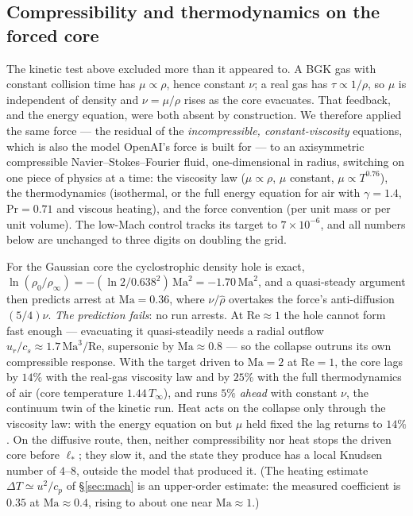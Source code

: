 \documentclass[11pt,a4paper]{article}
\begin{document}
\subsection{Compressibility and thermodynamics on the forced core}
\label{sec:compressible}

The kinetic test above excluded more than it appeared to. A BGK gas with constant collision time has
$\mu\propto\rho$, hence constant $\nu$; a real gas has $\tau\propto1/\rho$, so $\mu$ is independent of
density and $\nu=\mu/\rho$ rises as the core evacuates. That feedback, and the energy equation, were
both absent by construction. We therefore applied the same force --- the residual of the
\emph{incompressible, constant-viscosity} equations, which is also the model OpenAI's force is built
for --- to an axisymmetric compressible Navier--Stokes--Fourier fluid, one-dimensional in radius,
switching on one piece of physics at a time: the viscosity law ($\mu\propto\rho$, $\mu$ constant,
$\mu\propto T^{0.76}$), the thermodynamics (isothermal, or the full energy equation for air with
$\gamma=1.4$, $\mathrm{Pr}=0.71$ and viscous heating), and the force convention (per unit mass or per
unit volume). The low-Mach control tracks its target to $7\times10^{-6}$, and all numbers below are
unchanged to three digits on doubling the grid.

For the Gaussian core the cyclostrophic density hole is exact,
$\ln(\rho_0/\rho_\infty)=-(\ln2/0.638^2)\,\mathrm{Ma}^2=-1.70\,\mathrm{Ma}^2$, and a quasi-steady
argument then predicts arrest at $\mathrm{Ma}=0.36$, where $\nu/\hat\rho$ overtakes the force's
anti-diffusion $(5/4)\nu$. \emph{The prediction fails}: no run arrests. At $\mathrm{Re}\approx1$ the
hole cannot form fast enough --- evacuating it quasi-steadily needs a radial outflow
$u_r/c_s\approx1.7\,\mathrm{Ma}^3/\mathrm{Re}$, supersonic by $\mathrm{Ma}\approx0.8$ --- so the
collapse outruns its own compressible response. With the target driven to $\mathrm{Ma}=2$ at
$\mathrm{Re}=1$, the core lags by $14\%$ with the real-gas viscosity law and by $25\%$ with the full
thermodynamics of air (core temperature $1.44\,T_\infty$), and runs $5\%$ \emph{ahead} with constant
$\nu$, the continuum twin of the kinetic run. Heat acts on the collapse only through the viscosity law:
with the energy equation on but $\mu$ held fixed the lag returns to $14\%$. On the diffusive route,
then, neither compressibility nor heat stops the driven core before $\ell_*$; they slow it, and the
state they produce has a local Knudsen number of $4$--$8$, outside the model that produced it. (The
heating estimate $\Delta T\simeq u^2/c_p$ of \S\ref{sec:mach} is an upper-order estimate: the measured
coefficient is $0.35$ at $\mathrm{Ma}\approx0.4$, rising to about one near $\mathrm{Ma}\approx1$.)
\end{document}

